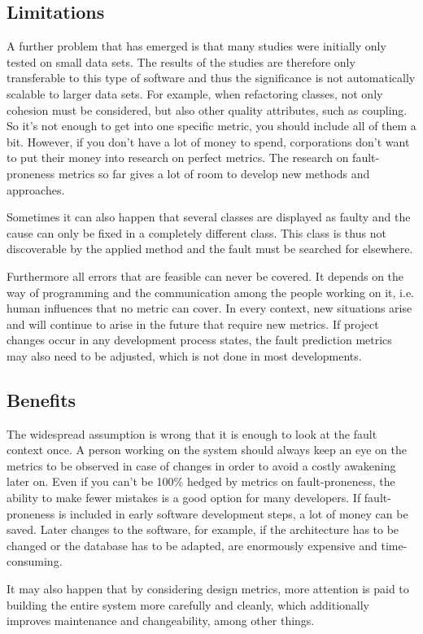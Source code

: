 
\subsection{Limitations}

A further problem that has emerged is that many studies were initially only tested on small data sets. The results of the studies are therefore only transferable to this type of software and thus the significance is not automatically scalable to larger data sets. For example, when refactoring classes, not only cohesion must be considered, but also other quality attributes, such as coupling. So it's not enough to get into one specific metric, you should include all of them a bit. However, if you don't have a lot of money to spend, corporations don't want to put their money into research on perfect metrics. The research on fault-proneness metrics so far gives a lot of room to develop new methods and approaches.

Sometimes it can also happen that several classes are displayed as faulty and the cause can only be fixed in a completely different class. This class is thus not discoverable by the applied method and the fault must be searched for elsewhere.

Furthermore all errors that are feasible can never be covered. It depends on the way of programming and the communication among the people working on it, i.e. human influences that no metric can cover. In every context, new situations arise and will continue to arise in the future that require new metrics. If project changes occur in any development process states, the fault prediction metrics may also need to be adjusted, which is not done in most developments.

\subsection{Benefits}

The widespread assumption is wrong that it is enough to look at the fault context once. A person working on the system should always keep an eye on the metrics to be observed in case of changes in order to avoid a costly awakening later on.
Even if you can't be 100\% hedged by metrics on fault-proneness, the ability to make fewer mistakes is a good option for many developers. If fault-proneness is included in early software development steps, a lot of money can be saved.
Later changes to the software, for example, if the architecture has to be changed or the database has to be adapted, are enormously expensive and time-consuming.

It may also happen that by considering design metrics, more attention is paid to building the entire system more carefully and cleanly, which additionally improves maintenance and changeability, among other things.
